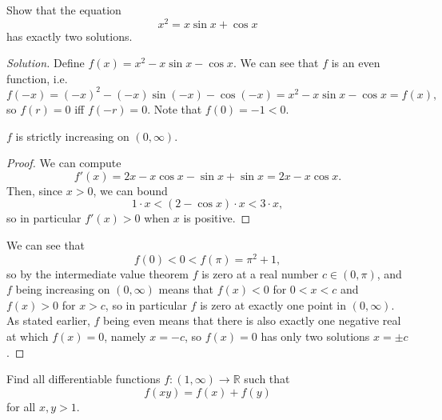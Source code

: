 \documentclass[11pt]{scrartcl}
\providecommand{\RR}{\mathbb R}
\newenvironment{soln}{\begin{proof}[Solution]}{\end{proof}}
\begin{document}
\setcounter{problem}{10}

\begin{problem}
	Show that the equation
	\[x^2 = x\sin x + \cos x\]
	has exactly two solutions.
\end{problem}

\begin{soln}
	Define $f(x) = x^2 - x\sin x - \cos x$.
	We can see that $f$ is an even function, i.e.
	\[f(-x) = (-x)^2 - (-x)\sin(-x) - \cos(-x)
	= x^2 - x\sin x - \cos x = f(x),\]
	so $f(r) = 0$ iff $f(-r) = 0$. Note that $f(0) = -1 < 0$.
	
	\begin{claim}
		$f$ is strictly increasing on $(0, \infty)$.
	\end{claim}
	\begin{proof}
		We can compute
		\[f'(x) = 2x - x\cos x - \sin x + \sin x = 2x - x\cos x.\]
		Then, since $x > 0$, we can bound
		\[1\cdot x < (2 - \cos x)\cdot x < 3\cdot x,\]
		so in particular $f'(x) > 0$ when $x$ is positive.
	\end{proof}
	
	We can see that
	\[f(0) < 0 < f(\pi) = \pi^2 + 1,\]
	so by the intermediate value theorem $f$ is zero
	at a real number $c\in (0, \pi)$,
	and $f$ being increasing on $(0,\infty)$ means that
	$f(x) < 0$ for $0 < x < c$ and $f(x) > 0$ for $x > c$,
	so in particular $f$ is zero at exactly one point in $(0,\infty)$.
	As stated earlier, $f$ being even means that there is also exactly one
	negative real at which $f(x) = 0$, namely $x = -c$,
	so $f(x) = 0$ has only two solutions $x = \pm c$.
\end{soln}

\begin{problem}
	Find all differentiable functions $f\colon(1,\infty)\to\RR$ such that
	\[f(xy) = f(x) + f(y)\]
	for all $x,y > 1$.
\end{problem}
\end{document}
